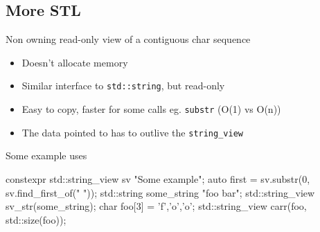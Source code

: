 \subsection[More]{More STL}

\begin{frame}[fragile]
  \begin{block}{Non owning read-only view of a contiguous char sequence}
    \begin{itemize}
    \item Doesn't allocate memory
    \item Similar interface to \texttt{std::string}, but read-only
    \item Easy to copy, faster for some calls eg. \texttt{substr} (O(1) vs O(n))
    \item The data pointed to has to outlive the \texttt{string_view}
    \end{itemize}
  \end{block}
  \begin{exampleblock}{Some example uses}
    \begin{cppcode*}{}
      constexpr std::string_view sv {"Some example"};
      auto first = sv.substr(0, sv.find_first_of(" "));
      std::string some_string {"foo bar"};
      std::string_view sv_str(some_string);
      char foo[3] = {'f','o','o'};
      std::string_view carr(foo, std::size(foo));
    \end{cppcode*}
  \end{exampleblock}
\end{frame}

